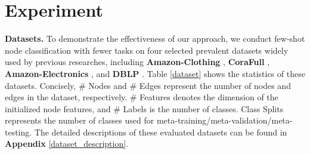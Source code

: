 \section{Experiment}
\noindent \textbf{Datasets.}
To demonstrate the effectiveness of our approach, we conduct few-shot node classification with fewer tasks on four selected prevalent datasets widely used by previous researches, including \textbf{Amazon-Clothing} \cite{mcauley2015inferring}, \textbf{CoraFull} \cite{bojchevski2017deep}, \textbf{Amazon-Electronics} \cite{mcauley2015inferring}, and \textbf{DBLP} \cite{tang2008arnetminer}. Table \ref{dataset} shows the statistics of these datasets. Concisely, \# Nodes and \# Edges represent the number of nodes and edges in the dataset, respectively. \# Features denotes the dimension of the initialized node features, and \# Labels is the number of classes. Class Splits represents the number of classes used for meta-training/meta-validation/meta-testing. 
The detailed descriptions of these evaluated datasets can be found in \textbf{Appendix} \ref{dataset_description}.

\begin{table}[ht]
\centering
\caption{Statistics of the datasets.}
\label{dataset}
\end{table}


